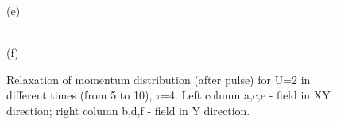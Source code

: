 \begin{figure}[h!]
\begin{minipage}[h]{0.43\linewidth}
\end{minipage}
\begin{minipage}[h]{0.43\linewidth}
 (e) \\
\end{minipage}
\hfill
\begin{minipage}[h]{0.43\linewidth}
 \\(f)
\end{minipage}
\caption{Relaxation of momentum distribution (after pulse) for U=2 in different times (from 5 to 10), $\tau$=4. Left column a,c,e - field in XY direction; right column b,d,f - field in Y direction.}
\label{fig:md_u2_A_max_relaxation}
\end{figure}


